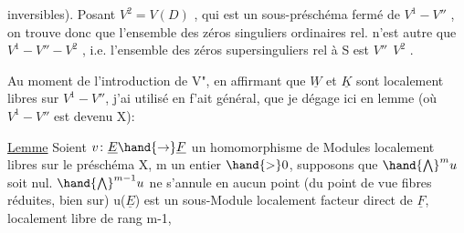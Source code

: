 
inversibles). Posant $V^2 = V(D)$ , qui est un sous-préschéma fermé de
$V^1-V''$ , on trouve donc que l'ensemble des  zéros singuliers
ordinaires rel. n'est autre que $V^1 - V'' - V^2$ , i.e. l'ensemble des
zéros supersinguliers  rel à S est $V''\ \ V^2$ .

 Au moment de l'introduction de V", en affirmant que $\underline{W}$ et $\underline{K}$ sont
localement libres sur $V^1-V''$, j'ai utilisé en f'ait général, que je dégage
ici en lemme (où $V^1-V''$ est devenu X):

\uline{Lemme} Soient $v\colon \underline{E} \hand{\to} \underline{F}$ un homomorphisme de Modules localement libres
sur le préschéma X,  m un entier $\hand{>}0$, supposons que $\hand{\bigwedge}^{m} u$ soit
nul.  
$\hand{\bigwedge}^{m-1} u$ ne s'annule en aucun point (du point de vue fibres réduites, bien
sur)   u($\underline{E}$) est un sous-Module localement facteur direct de $\underline{F}$,
localement libre de rang m-1, 

